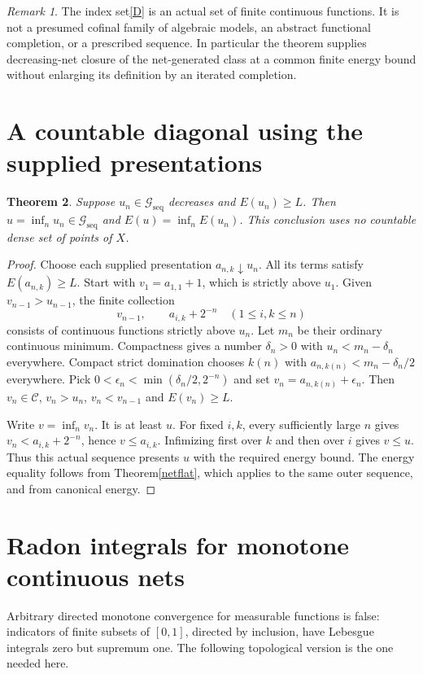 \documentclass[11pt]{article}
\newcommand{\C}{\mathcal C}
\newcommand{\GS}{\mathcal G_{\mathrm{seq}}}
\newtheorem{theorem}{Theorem}
\theoremstyle{remark}\newtheorem{remark}[theorem]{Remark}
\begin{document}
\begin{remark}
The index set\eqref{D} is an actual set of finite continuous
functions. It is not a presumed cofinal family of algebraic models,
an abstract functional completion, or a prescribed sequence.
In particular the theorem supplies decreasing-net closure of the
net-generated class at a common finite energy bound without
enlarging its definition by an iterated completion.
\end{remark}

\section{A countable diagonal using the supplied presentations}
\begin{theorem}\label{seqflat}
Suppose $u_n\in\GS$ decreases and $E(u_n)\ge L$.
Then $u=\inf_nu_n\in\GS$ and $E(u)=\inf_nE(u_n)$.
This conclusion uses no countable dense set of points of $X$.
\end{theorem}
\begin{proof}
Choose each supplied presentation $a_{n,k}\downarrow u_n$.
All its terms satisfy $E(a_{n,k})\ge L$.
Start with $v_1=a_{1,1}+1$, which is strictly above $u_1$.
Given $v_{n-1}>u_{n-1}$, the finite collection
\[
 v_{n-1},\qquad a_{i,k}+2^{-n}\quad(1\le i,k\le n)
\]
consists of continuous functions strictly above $u_n$.
Let $m_n$ be their ordinary continuous minimum. Compactness gives
a number $\delta_n>0$ with $u_n<m_n-\delta_n$ everywhere.
Compact strict domination chooses $k(n)$ with
$a_{n,k(n)}<m_n-\delta_n/2$ everywhere. Pick
$0<\epsilon_n<\min(\delta_n/2,2^{-n})$ and set
$v_n=a_{n,k(n)}+\epsilon_n$. Then $v_n\in\C$,
$v_n>u_n$, $v_n<v_{n-1}$ and $E(v_n)\ge L$.

Write $v=\inf_n v_n$. It is at least $u$.
For fixed $i,k$, every sufficiently large $n$ gives
$v_n<a_{i,k}+2^{-n}$, hence $v\le a_{i,k}$.
Infimizing first over $k$ and then over $i$ gives $v\le u$.
Thus this actual sequence presents $u$ with the required energy
bound. The energy equality follows from Theorem\ref{netflat},
which applies to the same outer sequence, and from canonical energy.
\end{proof}

\section{Radon integrals for monotone continuous nets}
Arbitrary directed monotone convergence for measurable functions
is false: indicators of finite subsets of $[0,1]$, directed by
inclusion, have Lebesgue integrals zero but supremum one.
The following topological version is the one needed here.
\end{document}

